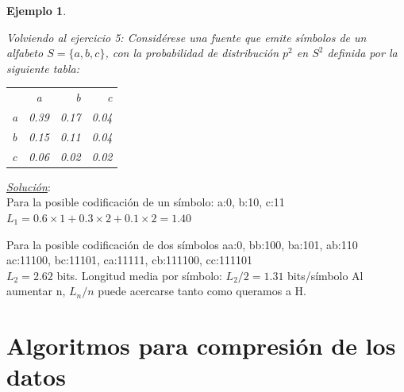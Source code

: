 \documentclass{beamer}
\theoremstyle{plain}
\theoremstyle{example}
\theoremstyle{example}
\newtheorem{ejemplo} [Ejemplo] {Ejemplo}
\begin{document}
\begin{frame}  \footnotesize 

\begin{ejemplo}\label{ej:4.7}

Volviendo al ejercicio 5: Considérese una fuente que emite símbolos de un alfabeto $S = \{a, b, c\}$, con la probabilidad de distribución $p^2$ en $S^2$ definida por la siguiente tabla:

\begin{center}
 \begin{tabular}{ l c r r}
         & a & b & c\\
   a & 0.39 & 0.17 & 0.04 \\
   b & 0.15 & 0.11 & 0.04 \\
   c & 0.06 & 0.02 & 0.02 \\
 \end{tabular}
\end{center}


\end{ejemplo}

\textit{\underline{Solución}}:\\
\vspace{0.25cm}
Para la posible codificación de un símbolo: a:0, b:10, c:11\\
$L_1 =0.6 \times 1+0.3 \times 2+0.1 \times 2=1.40$ 

\vspace{0.25cm}

Para la posible codificación de dos símbolos aa:0,  bb:100,  ba:101,  ab:110\\
ac:11100,  bc:11101,  ca:11111,  cb:111100,  cc:111101\\

$L_2 = 2.62$ bits. Longitud media por símbolo: $L_2/2 = 1.31 $ bits/símbolo
\vspace{0.25cm}
Al aumentar n, $L_n/n$ puede acercarse tanto como queramos a H.
 

\end{frame} 




\section{Algoritmos para compresión de los datos}
\end{document}
